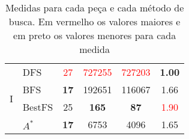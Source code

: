 \begin{table}[ h ]
\begin{tabular}{|c|l|c|c|c|c|}
			\multirow{5}{*}{I} & DFS & \textcolor{red}{27} & \textcolor{red}{727255} & \textcolor{red}{727203} & \textbf{1.00} \\ \cline{2-6}
					& BFS & \textbf{17} & 192651 & 116067 & 1.66  \\ \cline{2-6}
					& BestFS & 25 & \textbf{165} & \textbf{87} & \textcolor{red}{1.90}  \\ \cline{2-6}
					& $A^*$ & \textbf{17} & 6753 & 4096 & 1.65 \\ \hline
		\end{tabular}
		\caption{Medidas para cada peça e cada método de busca. Em vermelho os valores maiores e em preto os valores menores para cada medida}
		\label{tab:comparison}
	\end{table}
	
	
	
	
	
	
	
	
	